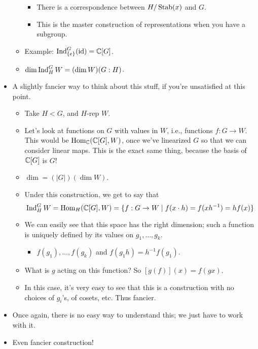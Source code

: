 \documentclass[../notes.tex]{subfiles}
\begin{document}
\begin{itemize}
\begin{itemize}
        \begin{itemize}
            \item There is a correspondence between $H/\operatorname{Stab}(x)$ and $G$.
            \item This is the master construction of representations when you have a subgroup.
        \end{itemize}
        \item Example: $\operatorname{Ind}_{\{e\}}^G(\operatorname{id})=\mathbb{C}[G]$.
        \item $\dim\operatorname{Ind}_H^GW=(\dim W)(G:H)$.
    \end{itemize}
    \item A slightly fancier way to think about this stuff, if you're unsatisfied at this point.
    \begin{itemize}
        \item Take $H<G$, and $H$-rep $W$.
        \item Let's look at functions on $G$ with values in $W$, i.e., functions $f:G\to W$. This would be $\operatorname{Hom}_{\mathbb{C}}(\mathbb{C}[G],W)$, once we've linearized $G$ so that we can consider linear maps. This is the exact same thing, because the basis of $\mathbb{C}[G]$ is $G$!
        \item $\dim=(|G|)(\dim W)$.
        \item Under this construction, we get to say that
        \begin{equation*}
            \operatorname{Ind}_H^GW = \operatorname{Hom}_H(\mathbb{C}[G],W)=\{f:G\to W\mid f(x\cdot h)=f(xh^{-1})=hf(x)\}
        \end{equation*}
        \item We can easily see that this space has the right dimension; such a function is uniquely defined by its values on $g_1,\dots,g_k$.
        \begin{itemize}
            \item $f(g_1),\dots,f(g_k)$ and $f(g_1h)=h^{-1}f(g_1)$.
        \end{itemize}
        \item What is $g$ acting on this function? So $[g(f)](x)=f(gx)$.
        \item In this case, it's very easy to see that this is a construction with no choices of $g_i$'s, of cosets, etc. Thus fancier.
    \end{itemize}
    \item Once again, there is no easy way to understand this; we just have to work with it.
    \item Even fancier construction!
    \begin{itemize}

\end{itemize}
\end{itemize}
\end{document}
